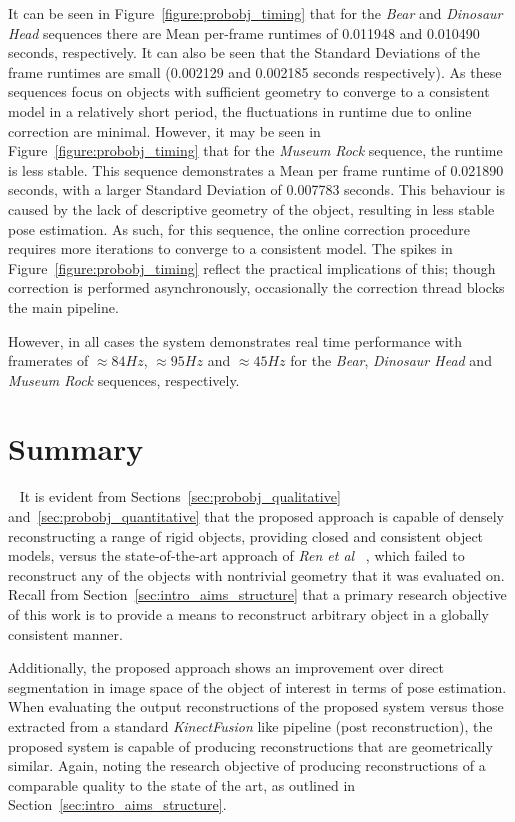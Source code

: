 It can be seen in Figure~\ref{figure:probobj_timing} that for the \textit{Bear} and 
\textit{Dinosaur Head} sequences there are Mean per-frame runtimes of 0.011948 and 
0.010490 seconds, respectively. It can also be seen that the Standard Deviations of the frame 
runtimes are small (0.002129 and 0.002185 seconds respectively). As these sequences focus on objects 
with sufficient geometry to converge to a consistent model in a relatively short period, the 
fluctuations in runtime due to online correction are minimal. However, it may be seen in 
Figure~\ref{figure:probobj_timing} that for the \textit{Museum Rock} sequence, the runtime is 
less stable. This sequence demonstrates a Mean per frame runtime of 0.021890 seconds, with 
a larger Standard Deviation of 0.007783 seconds. This behaviour is caused by the lack of 
descriptive geometry of the object, resulting in less stable pose estimation. As such, for this 
sequence, the online correction procedure requires more iterations to converge to a consistent 
model. The spikes in Figure~\ref{figure:probobj_timing} reflect the practical implications of 
this; though correction is performed asynchronously, occasionally the correction thread blocks the 
main pipeline.

However, in all cases the system demonstrates real time performance with framerates of 
\( \approx 84Hz \), \( \approx 95Hz \) and \( \approx 45Hz \) for the \textit{Bear}, 
\textit{Dinosaur Head} and \textit{Museum Rock} sequences, respectively.

\section{Summary}
~\label{sec:probobj_discussion}
It is evident from Sections~\ref{sec:probobj_qualitative} and~\ref{sec:probobj_quantitative} 
that the proposed approach is capable of densely reconstructing a range of rigid objects, providing 
closed and consistent object models, versus the state-of-the-art approach of \textit{Ren et al} 
~\cite{Ren2013}, which failed to reconstruct any of the objects with nontrivial geometry that it 
was evaluated on. Recall from Section~\ref{sec:intro_aims_structure} that a primary research objective 
of this work is to provide a means to reconstruct arbitrary object in a globally consistent manner.

Additionally, the proposed approach shows an improvement over direct segmentation 
in image space of the object of interest in terms of pose estimation. When evaluating the output 
reconstructions of the proposed system versus those extracted from a standard \textit{KinectFusion} 
like pipeline (post reconstruction), the proposed system is capable of producing reconstructions that 
are geometrically similar. Again, noting the research objective of producing reconstructions of a 
comparable quality to the state of the art, as outlined in Section~\ref{sec:intro_aims_structure}.

